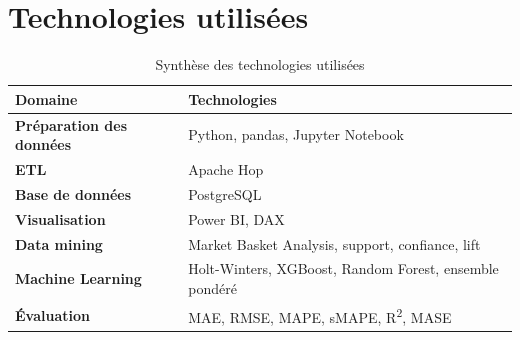 \documentclass[12pt,a4paper,twoside]{report}
\begin{document}
\section{Technologies utilisées}

\begin{table}[H]
\centering
{}
\begin{tabularx}{\textwidth}{>{\bfseries}p{4cm}X}
\toprule
\rowcolor{TableHeader}
\color{white}Domaine & \color{white}Technologies \\
\midrule
Préparation des données & Python, pandas, Jupyter Notebook \\
ETL & Apache Hop \\
Base de données & PostgreSQL \\
Visualisation & Power BI, DAX \\
Data mining & Market Basket Analysis, support, confiance, lift \\
Machine Learning & Holt-Winters, XGBoost, Random Forest, ensemble pondéré \\
Évaluation & MAE, RMSE, MAPE, sMAPE, R\textsuperscript{2}, MASE \\
\bottomrule
\end{tabularx}
\caption{Synthèse des technologies utilisées}
\end{table}

\printbibliography
\end{document}
